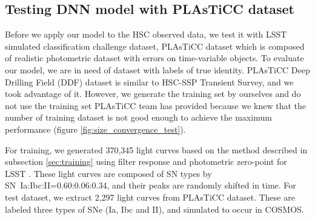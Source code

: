 \documentclass[proof]{pasj01}
\begin{document}
\subsection{Testing DNN model with PLAsTiCC dataset} 
\label{sec:p}
%
Before we apply our model to the HSC observed data, we test it with LSST simulated classification challenge dataset, PLAsTiCC dataset \citep{allam18a,malz19a} which is composed of realistic photometric dataset with errors on time-variable objects.
To evaluate our model, we are in need of dataset with labels of true identity. 
PLAsTiCC Deep Drilling Field (DDF) dataset is similar to HSC-SSP Transient Survey, and we took advantage of it.
However, %
we generate the training set by ourselves 
and do not use the training set PLAsTiCC team has provided because we knew that the number of training dataset is not good enough to achieve the maximum performance (figure \ref{fig:size_convergence_test}).

For training, we generated 370,345 light curves based on the method described in subsection \ref{sec:training} using filter response and photometric zero-point for LSST \citep{ivezic19a}.
These light curves are composed of SN types by SN~Ia:Ibc:II=0.60:0.06:0.34, and their peaks are randomly shifted in time.
%
For test dataset, we extract 2,297 light curves from PLAsTiCC dataset.
These are labeled three types of SNe (Ia, Ibc and II), and simulated to occur in COSMOS.
\end{document}
